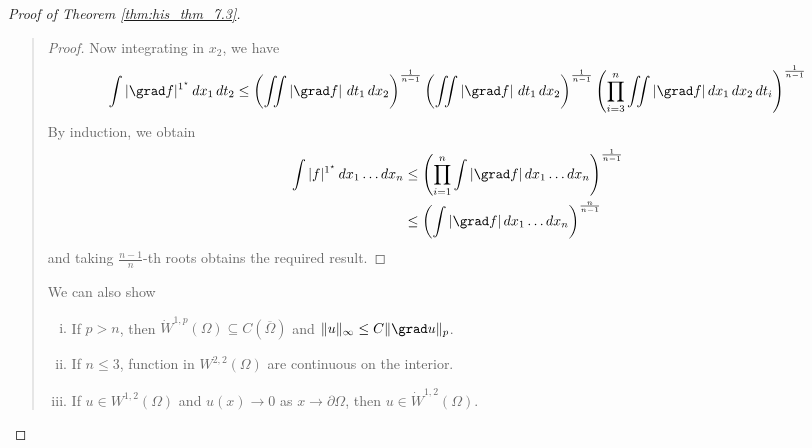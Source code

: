 \documentclass[10pt, oneside, reqno]{amsart}
\theoremstyle{plain}%
\numberwithin{equation}{section}
\theoremstyle{definition}
\theoremstyle{remark}
\begin{document}
\begin{proof}[Proof of Theorem \ref{thm:his_thm_7.3}]{\ }
\begin{quote}
\begin{proof}
         Now integrating in $x_2$, we have \begin{align*}
                    \int |\grad f |^{1^\star} \, dx_1 \, dt_2 \leq \left( \iint \left|\grad f \right| \, dt_1 \, dx_2 \right)^{\frac{1}{n-1}}  \left( \iint \left|\grad f \right| \, dt_1 \, dx_2 \right)^{\frac{1}{n-1}}  \left(\prod_{i=3}^n \iint |\grad f| \, dx_1 \, dx_2 \, dt_i \right)^{\frac{1}{n-1}}
                \end{align*}
        By induction, we obtain \begin{align*}          
            \int |f|^{1^\star} \, dx_1 \dots dx_n  &\leq \left( \prod_{i=1}^n \int |\grad f | \, dx_1 \dots dx_n \right)^{\frac{1}{n-1}} \\
                        &\leq \left( \int |\grad f| \, dx_1 \dots dx_n \right)^{\frac{n}{n-1}}
        \end{align*}     and taking $\frac{n-1}{n}$-th roots obtains the required result.
        \end{proof}
        
        We can also show \begin{enumerate}[(i)]
            \item If $p > n$, then $\dot W^{1, p}(\Omega) \subseteq C(\overline \Omega)$ and $\| u \|_{\infty} \leq C \| \grad u \|_p$.
            \item If $n \leq 3$, function in $W^{2, 2}(\Omega)$ are continuous on the interior.
            \item If $u \in W^{1, 2}(\Omega)$ and $u(x) \rightarrow 0$ as $x \rightarrow \partial \Omega$, then $u \in \dot W^{1, 2}(\Omega)$.
        \end{enumerate}
    
    \end{quote}
    
    
    

\end{proof}
\end{document}
